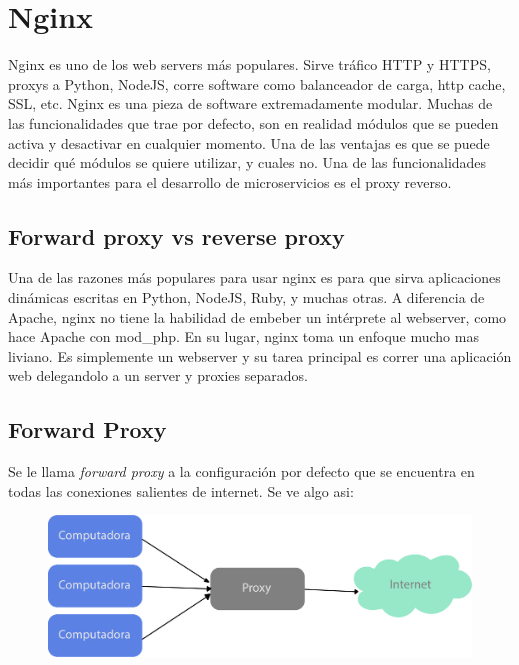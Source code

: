 \section[Nginx]{Nginx}

Nginx es uno de los web servers más populares. Sirve tráfico HTTP y HTTPS, proxys a Python, NodeJS, corre software como balanceador de carga, http cache, SSL, etc.
Nginx es una pieza de software extremadamente modular. Muchas de las funcionalidades que trae por defecto, son en realidad módulos que se pueden activa y desactivar en cualquier momento. Una de las ventajas es que se puede decidir qué módulos se quiere utilizar, y cuales no.
Una de las funcionalidades más importantes para el desarrollo de microservicios es el proxy reverso.

\subsection[Forward proxy vs reverse proxy]{Forward proxy vs reverse proxy}

Una de las razones más populares para usar nginx es para que sirva aplicaciones dinámicas escritas en Python, NodeJS, Ruby, y muchas otras.
A diferencia de Apache, nginx no tiene la habilidad de embeber un intérprete al webserver, como hace Apache con mod\_php. En su lugar, nginx toma un enfoque mucho mas liviano. Es simplemente un webserver y su tarea principal es correr una aplicación web delegandolo a un server y proxies separados.

\subsection[Forward Proxy]{Forward Proxy}

Se le llama \textit{forward proxy} a la configuración por defecto que se encuentra en todas las conexiones salientes de internet. Se ve algo asi:

\begin{figure}[h!]
  \centering
    \includegraphics[scale=0.7]{images/forward-proxy.png}
  \label{fig:forwardproxy}
\end{figure}

